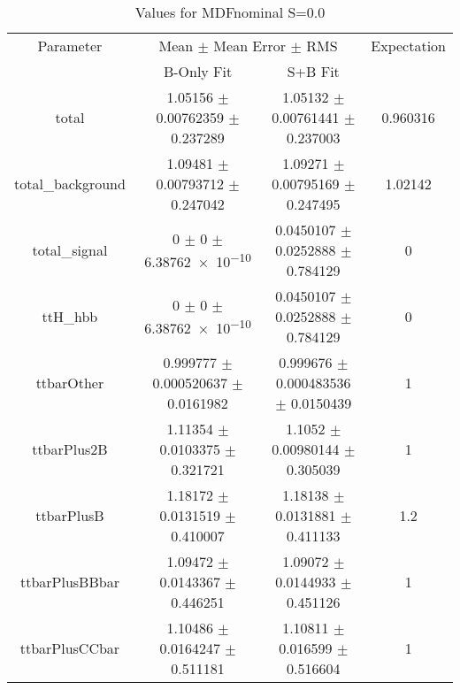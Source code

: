 \begin{table}
\centering
\caption{Values for MDFnominal S=0.0}
\begin{tabular}{cccc}
\toprule
Parameter & \multicolumn{2}{c}{Mean $\pm$ Mean Error $\pm$ RMS} & Expectation\\
 & B-Only Fit & S+B Fit & \\
\midrule
total & \num{1.05156} $\pm$ \num{0.00762359} $\pm$ \num{0.237289} & \num{1.05132} $\pm$ \num{0.00761441} $\pm$ \num{0.237003} & \num{0.960316}\\
total\_background & \num{1.09481} $\pm$ \num{0.00793712} $\pm$ \num{0.247042} & \num{1.09271} $\pm$ \num{0.00795169} $\pm$ \num{0.247495} & \num{1.02142}\\
total\_signal & \num{0} $\pm$ \num{0} $\pm$ \num{6.38762e-10} & \num{0.0450107} $\pm$ \num{0.0252888} $\pm$ \num{0.784129} & \num{0}\\
ttH\_hbb & \num{0} $\pm$ \num{0} $\pm$ \num{6.38762e-10} & \num{0.0450107} $\pm$ \num{0.0252888} $\pm$ \num{0.784129} & \num{0}\\
ttbarOther & \num{0.999777} $\pm$ \num{0.000520637} $\pm$ \num{0.0161982} & \num{0.999676} $\pm$ \num{0.000483536} $\pm$ \num{0.0150439} & \num{1}\\
ttbarPlus2B & \num{1.11354} $\pm$ \num{0.0103375} $\pm$ \num{0.321721} & \num{1.1052} $\pm$ \num{0.00980144} $\pm$ \num{0.305039} & \num{1}\\
ttbarPlusB & \num{1.18172} $\pm$ \num{0.0131519} $\pm$ \num{0.410007} & \num{1.18138} $\pm$ \num{0.0131881} $\pm$ \num{0.411133} & \num{1.2}\\
ttbarPlusBBbar & \num{1.09472} $\pm$ \num{0.0143367} $\pm$ \num{0.446251} & \num{1.09072} $\pm$ \num{0.0144933} $\pm$ \num{0.451126} & \num{1}\\
ttbarPlusCCbar & \num{1.10486} $\pm$ \num{0.0164247} $\pm$ \num{0.511181} & \num{1.10811} $\pm$ \num{0.016599} $\pm$ \num{0.516604} & \num{1}\\
\bottomrule
\end{tabular}
\end{table}